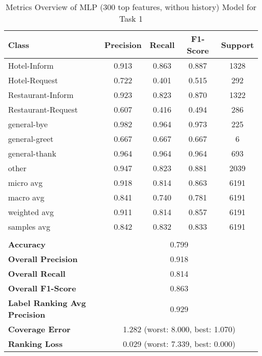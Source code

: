 
\begin{table}[h]
\centering

\begin{tabular}{|l|c|c|c|c|}
\hline
\textbf{Class}& \textbf{Precision} & \textbf{Recall} & \textbf{F1-Score} & \textbf{Support} \\ \hline
Hotel-Inform & 0.913 & 0.863 & 0.887 & 1328 \\ \hline
Hotel-Request & 0.722 & 0.401 & 0.515 & 292 \\ \hline
Restaurant-Inform & 0.923 & 0.823 & 0.870 & 1322 \\ \hline
Restaurant-Request & 0.607 & 0.416 & 0.494 & 286 \\ \hline
general-bye & 0.982 & 0.964 & 0.973 & 225 \\ \hline
general-greet & 0.667 & 0.667 & 0.667 & 6 \\ \hline
general-thank & 0.964 & 0.964 & 0.964 & 693 \\ \hline
other & 0.947 & 0.823 & 0.881 & 2039 \\ \hline\hline
micro avg & 0.918 & 0.814 & 0.863 & 6191 \\ \hline
macro avg & 0.841 & 0.740 & 0.781 & 6191 \\ \hline
weighted avg & 0.911 & 0.814 & 0.857 & 6191 \\ \hline
samples avg & 0.842 & 0.832 & 0.833 & 6191 \\ \hline
\multicolumn{5}{c}{}\\ \hline

\textbf{Accuracy}                    & \multicolumn{4}{c|}{0.799}                                 \\ \hline
\textbf{Overall Precision}           & \multicolumn{4}{c|}{0.918}                                \\ \hline
\textbf{Overall Recall}              & \multicolumn{4}{c|}{0.814}                                   \\ \hline
\textbf{Overall F1-Score}            & \multicolumn{4}{c|}{0.863}                                  \\ \hline
\textbf{Label Ranking Avg Precision} & \multicolumn{4}{c|}{0.929}                                    \\ \hline
\textbf{Coverage Error}              & \multicolumn{4}{c|}{1.282 (worst: 8.000, best: 1.070)}                             \\ \hline
\textbf{Ranking Loss}                & \multicolumn{4}{c|}{0.029 (worst: 7.339, best: 0.000)}                             \\ \hline
\end{tabular}

\caption{Metrics Overview of MLP (300 top features, withou history) Model for Task 1}
\label{table:MLP (300 top features, withou history)_metrics_task_1}
\end{table}
    